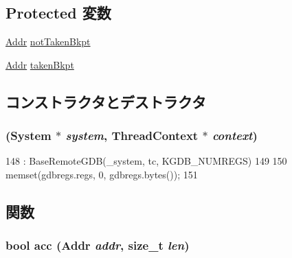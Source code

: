 \subsection*{Protected 変数}
\begin{DoxyCompactItemize}
\item 
\hyperlink{classm5_1_1params_1_1Addr}{Addr} \hyperlink{classAlphaISA_1_1RemoteGDB_ae1a0a563a724aaffa8ae5b4095957aa4}{notTakenBkpt}
\item 
\hyperlink{classm5_1_1params_1_1Addr}{Addr} \hyperlink{classAlphaISA_1_1RemoteGDB_abfdbe67e311a613bbbe39b730279f3e1}{takenBkpt}
\end{DoxyCompactItemize}


\subsection{コンストラクタとデストラクタ}
\hypertarget{classAlphaISA_1_1RemoteGDB_a7d97c5a4edd8630299b2b0521ae32d98}{
\subsubsection[{RemoteGDB}]{ ({\bf System} $\ast$ {\em system}, \/  {\bf ThreadContext} $\ast$ {\em context})}}
\label{classAlphaISA_1_1RemoteGDB_a7d97c5a4edd8630299b2b0521ae32d98}



\begin{DoxyCode}
148     : BaseRemoteGDB(_system, tc, KGDB_NUMREGS)
149 {
150     memset(gdbregs.regs, 0, gdbregs.bytes());
151 }
\end{DoxyCode}


\subsection{関数}
\hypertarget{classAlphaISA_1_1RemoteGDB_ac4c7be164f087f2f53d137d9768809a7}{
\subsubsection[{acc}]{\setlength{\rightskip}{0pt plus 5cm}bool acc ({\bf Addr} {\em addr}, \/  size\_\-t {\em len})}}
\label{classAlphaISA_1_1RemoteGDB_ac4c7be164f087f2f53d137d9768809a7}


